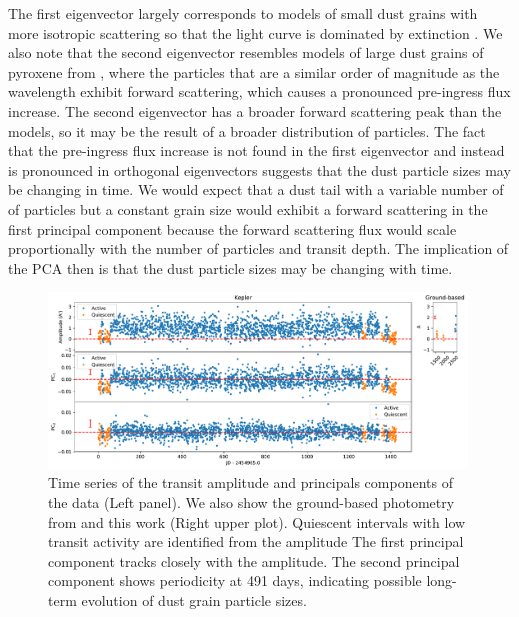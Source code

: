 \documentclass[preprint,trackchanges]{aastex61}
\begin{document}
The first eigenvector largely corresponds to models of small dust grains with more isotropic scattering so that the light curve is dominated by extinction \citep{budaj12,brogi2012}.
We also note that the second eigenvector resembles models of large dust grains of pyroxene from \citet{budaj12}, where the particles that are a similar order of magnitude as the wavelength exhibit forward scattering, which causes a pronounced pre-ingress flux increase.
The second eigenvector has a broader forward scattering peak than the \citet{budaj12} models, so it may be the result of a broader distribution of particles.
The fact that the pre-ingress flux increase is not found in the first eigenvector and instead is pronounced in orthogonal eigenvectors suggests that the dust particle sizes may be changing in time.
We would expect that a dust tail with a variable number of of particles but a constant grain size would  exhibit a forward scattering in the first principal component because the forward scattering flux would scale proportionally with the number of particles and transit depth.
The implication of the PCA then is that the dust particle sizes may be changing with time.

\begin{figure}[!hbtp]
\begin{centering}
\includegraphics[width=0.99\textwidth]{pc_tser_w_quiescent.pdf}
\caption{Time series of the transit amplitude and principals components of the  data (Left panel).
We also show the ground-based photometry from \citet{schlawin2016kic1255} and this work (Right upper plot).
Quiescent intervals with low transit activity are identified from the amplitude 
The first principal component tracks closely with the amplitude.
The second principal component shows periodicity at 491 days, indicating possible long-term evolution of dust grain particle sizes.
}\label{fig:tserPC}
\end{centering}
\end{figure}
\end{document}
